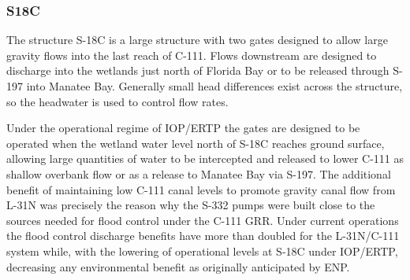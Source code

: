 %
%


\clearpage
\subsubsection{S18C}

The structure S-18C is a large structure with two gates designed to allow large gravity flows into the last reach of C-111.
Flows downstream are designed to discharge into the wetlands just north of Florida Bay or to be released through S-197 into Manatee Bay.
Generally small head differences exist across the structure, so the headwater is used to control flow rates.

Under the operational regime of IOP/ERTP the gates are designed to be operated when the wetland water level north of S-18C reaches ground surface, allowing large quantities of water to be intercepted and released to lower C-111 as shallow overbank flow or as a release to Manatee Bay via S-197.
The additional benefit of maintaining low C-111 canal levels to promote gravity canal flow from L-31N was precisely the reason why the S-332 pumps were built close to the sources needed for flood control under the C-111 GRR.
Under current operations the flood control discharge benefits have more than doubled for the L-31N/C-111 system while, with the lowering of operational levels at S-18C under IOP/ERTP, decreasing any environmental benefit as originally anticipated by ENP.

